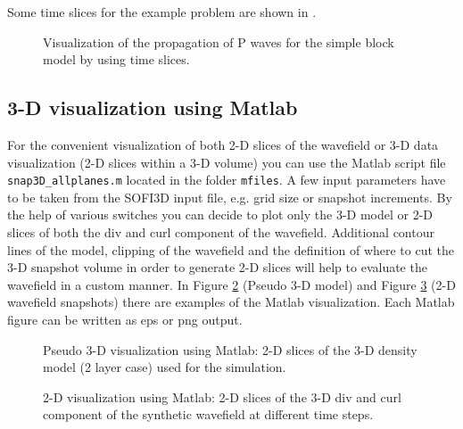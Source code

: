 \documentclass[11pt,onecolumn,oneside]{article}
\begin{document}
Some time slices for the example problem are shown in .
\begin{figure}
\begin{center}
\caption{\label{slices_snap2.pdf} Visualization of the propagation of P waves for the simple block model by using time slices.}
\end{center}
\end{figure}
\clearpage

\subsection{3-D visualization using Matlab}

For the convenient visualization of both 2-D slices of the wavefield or 3-D data visualization (2-D slices within a 3-D volume) you can use the Matlab script file  \lstinline{snap3D_allplanes.m} located in the folder  \lstinline{mfiles}. A few input parameters have to be taken from the SOFI3D input file, e.g. grid size or snapshot increments. By the help of various switches you can decide to plot only the 3-D model or 2-D slices of both the div and curl component of the wavefield. Additional contour lines of the model, clipping of the wavefield and the definition of where to cut the 3-D snapshot volume in order to generate 2-D slices will help to evaluate the wavefield in a custom manner. In Figure \ref{matlab_visu_model} (Pseudo 3-D model) and Figure \ref{matlab_visu_snap} (2-D wavefield snapshots) there are examples of the Matlab visualization. Each Matlab figure can be written as eps or png output.


\begin{figure}[ht]
\begin{center}
\caption{\label{matlab_visu_model} Pseudo 3-D visualization using Matlab: 2-D slices of the 3-D density model (2 layer case) used for the simulation.}
\end{center}
\end{figure} 

\begin{figure}[ht]
\begin{center}
\caption{\label{matlab_visu_snap} 2-D visualization using Matlab: 2-D slices of the 3-D div and curl component of the synthetic wavefield at different time steps.}
\end{center}
\end{figure} 
\end{document}
